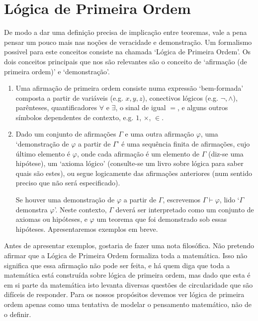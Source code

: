 \section*{Lógica de Primeira Ordem}

De modo a dar uma definição precisa de implicação entre teoremas, vale a pena pensar um pouco mais nas noções de veracidade e demonstração. Um formalismo possivel para este conceitos consiste na chamada `Lógica de Primeira Ordem'. Os dois conceitos principais que nos são relevantes são o conceito de `afirmação (de primeira ordem)' e `demonstração'.

\begin{enumerate}
\item Uma afirmação de primeira ordem consiste numa expressão `bem-formada' composta a partir de variáveis (e.g. $x,y,z$), conectivos lógicos (e.g. $\neg, \land$), parênteses, quantificadores $\forall$ e $\exists$, o sinal de igual $=$, e alguns outros símbolos dependentes de contexto, e.g. $1$, $\times$, $\in$.

\item Dado um conjunto de afirmações $\Gamma$ e uma outra afirmação $\varphi$, uma `demonstração de $\varphi$ a partir de $\Gamma$' é uma sequência finita de afirmações, cujo último elemento é $\varphi$, onde cada afirmação é um elemento de $\Gamma$ (diz-se uma hipótese), um `axioma lógico' (consulte-se um livro sobre lógica para saber quais são estes), ou segue logicamente das afirmações anteriores (num sentido preciso que não será especificado).

Se houver uma demonstração de $\varphi$ a partir de $\Gamma$, escrevemos $\Gamma \vdash \varphi$, lido `$\Gamma$ demonstra $\varphi$'. Neste contexto, $\Gamma$ deverá ser interpretado como um conjunto de axiomas ou hipóteses, e $\varphi$ um teorema que foi demonstrado sob essas hipóteses. Apresentaremos exemplos em breve.
\end{enumerate}

Antes de apresentar exemplos, gostaria de fazer uma nota filosófica. Não pretendo afirmar que a Lógica de Primeira Ordem formaliza toda a matemática. Isso não significa que essa afirmação não pode ser feita, e há quem diga que toda a matemática está construída sobre lógica de primeira ordem, mas dado que esta é em si parte da matemática isto levanta diversas questões de circularidade que são difíceis de responder. Para os nossos propósitos devemos ver lógica de primeira ordem apenas como uma tentativa de modelar o pensamento matemático, não de o definir.

